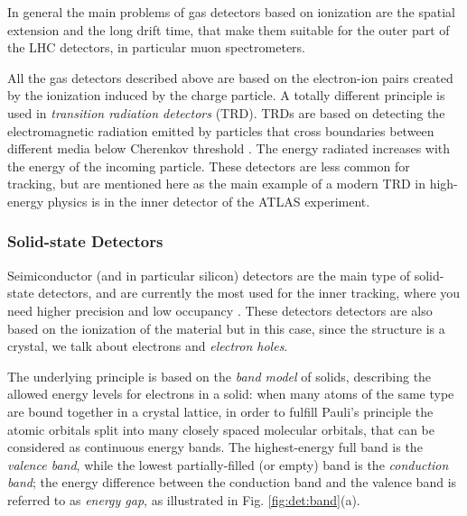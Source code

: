 In general the main problems of gas detectors based on ionization are the spatial extension and the long drift time, that make them suitable for the outer part of the LHC detectors, in particular muon spectrometers.

All the gas detectors described above are based on the electron-ion pairs created by the ionization induced by the charge particle. A totally different principle is used in \textit{transition radiation detectors} (TRD). TRDs are based on detecting the electromagnetic radiation emitted by particles that cross boundaries between different media below Cherenkov threshold \cite{1402-4896-1982-T2A-024}. The energy radiated increases with the energy of the incoming particle. These detectors are less common for tracking, but are mentioned here as the main example of a modern TRD in high-energy physics is in the inner detector of the ATLAS experiment.

\subsubsection{Solid-state Detectors}

Seimiconductor (and in particular silicon) detectors are the main type of solid-state detectors, and are currently the most used for the inner tracking, where you need higher precision and low occupancy \cite{Hartmann:2009zza}. These detectors detectors are also based on the ionization of the material but in this case, since the structure is a crystal, we talk about electrons and \textit{electron holes}. 

The underlying principle is based on the \textit{band model} of solids, describing the allowed energy levels for electrons in a solid: when many atoms of the same type are bound together in a crystal lattice, in order to fulfill Pauli's principle the atomic orbitals split into many closely spaced molecular orbitals, that can be considered as continuous energy bands. The highest-energy full band is the \textit{valence band}, while the lowest partially-filled (or empty) band is the \textit{conduction band}; the energy difference between the conduction band and the valence band is referred to as \textit{energy gap}, as illustrated in Fig. \ref{fig:det:band}(a). 


